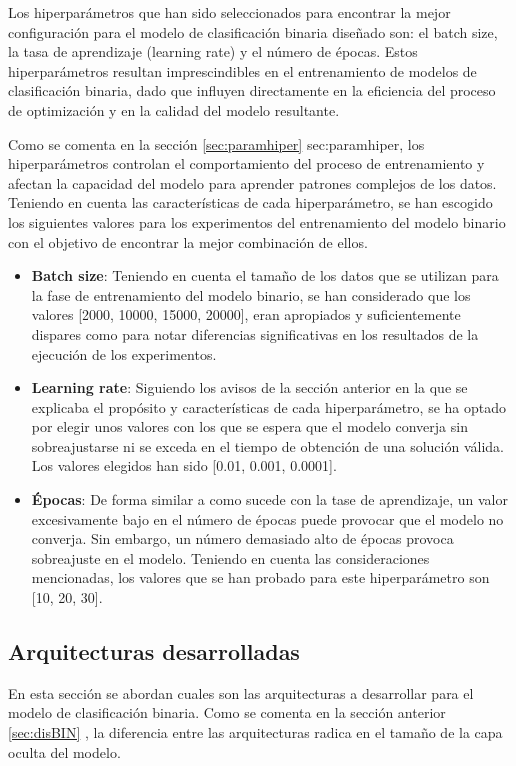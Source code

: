 Los hiperparámetros que han sido seleccionados para encontrar la mejor configuración para el modelo de clasificación binaria diseñado son: el batch size, la tasa de aprendizaje (learning rate) y el número de épocas. Estos hiperparámetros resultan imprescindibles en el entrenamiento de modelos de clasificación binaria, dado que influyen directamente en la eficiencia del proceso de optimización y en la calidad del modelo resultante.

Como se comenta en la sección \ref{sec:paramhiper} \refname{sec:paramhiper}, los hiperparámetros controlan el comportamiento del proceso de entrenamiento y afectan la capacidad del modelo para aprender patrones complejos de los datos. Teniendo en cuenta las características de cada hiperparámetro, se han escogido los siguientes valores para los experimentos del entrenamiento del modelo binario con el objetivo de encontrar la mejor combinación de ellos.

\begin{itemize}
	\item \textbf{Batch size}: Teniendo en cuenta el tamaño de los datos que se utilizan para la fase de entrenamiento del modelo binario, se han considerado que los valores [2000, 10000, 15000, 20000], eran apropiados y suficientemente dispares como para notar diferencias significativas en los resultados de la ejecución de los experimentos.
	\item \textbf{Learning rate}: Siguiendo los avisos de la sección anterior en la que se explicaba el propósito y características de cada hiperparámetro, se ha optado por elegir unos valores con los que se espera que el modelo converja sin sobreajustarse ni se exceda en el tiempo de obtención de una solución válida. Los valores elegidos han sido [0.01, 0.001, 0.0001].
	\item \textbf{Épocas}: De forma similar a como sucede con la tase de aprendizaje, un valor excesivamente bajo en el número de épocas puede provocar que el modelo no converja. Sin embargo, un número demasiado alto de épocas provoca sobreajuste en el modelo. Teniendo en cuenta las consideraciones mencionadas, los valores que se han probado para este hiperparámetro son [10, 20, 30].
\end{itemize}

\subsection{Arquitecturas desarrolladas}
En esta sección se abordan cuales son las arquitecturas a desarrollar para el modelo de clasificación binaria. Como se comenta en la sección anterior \ref{sec:disBIN} , la diferencia entre las arquitecturas radica en el tamaño de la capa oculta del modelo.

